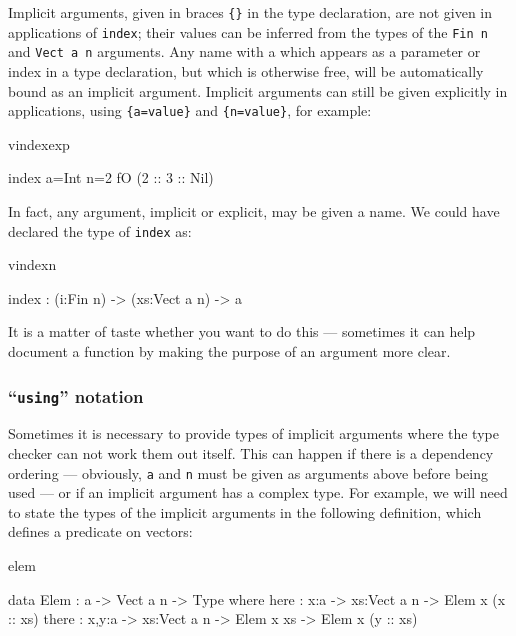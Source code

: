 \noindent
Implicit arguments, given in braces \texttt{\{\}} in the type declaration, are
not given in applications of \texttt{index}; their values can be inferred from
the types of the \texttt{Fin n} and \texttt{Vect a n} arguments. Any name 
with a  which
appears as a parameter or index in a type declaration, but which is otherwise
free, will be automatically bound as an implicit argument.  Implicit arguments
can still be given explicitly in applications, using \texttt{\{a=value\}} and
\texttt{\{n=value\}}, for example:

\begin{SaveVerbatim}{vindexexp}

index {a=Int} {n=2} fO (2 :: 3 :: Nil)

\end{SaveVerbatim}

\noindent
In fact, any argument, implicit or explicit, may be given a name. We could have
declared the type of \texttt{index} as:

\begin{SaveVerbatim}{vindexn}

index : (i:Fin n) -> (xs:Vect a n) -> a

\end{SaveVerbatim}

\noindent
It is a matter of taste whether you want to do this --- sometimes it can help
document a function by making the purpose of an argument more clear.

\subsubsection{``\texttt{using}'' notation}

Sometimes it is necessary to provide types of implicit arguments where
the type checker can not work them out itself. This can happen if there is a
dependency ordering --- obviously, \texttt{a} and \texttt{n} must be given as arguments above
before being used --- or if an implicit argument has a complex type. For example,
we will need to state the types of the implicit arguments in the following
definition, which defines a predicate on vectors:

\begin{SaveVerbatim}{elem}

data Elem : a -> Vect a n -> Type where
   here :  {x:a} ->   {xs:Vect a n} -> Elem x (x :: xs)
   there : {x,y:a} -> {xs:Vect a n} -> Elem x xs -> Elem x (y :: xs)

\end{SaveVerbatim}

